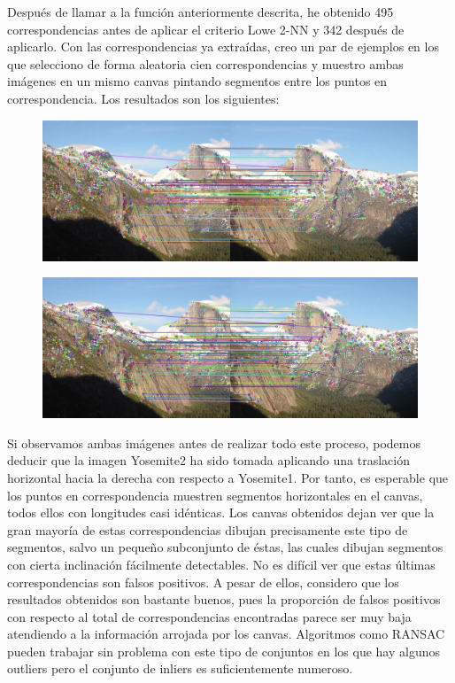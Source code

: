\documentclass[10pt,a4paper]{article}
\begin{document}
Después de llamar a la función anteriormente descrita, he obtenido 495 correspondencias antes de aplicar el criterio Lowe 2-NN y 342 después de aplicarlo. Con las correspondencias ya extraídas, creo un par de ejemplos en los que selecciono de forma aleatoria cien correspondencias y muestro ambas imágenes en un mismo canvas pintando segmentos entre los puntos en correspondencia. Los resultados son los siguientes:

\begin{figure}[h]
	\includegraphics[width=\textwidth]{corresp1_yosemite}
\end{figure}

\begin{figure}[h]
	\includegraphics[width=\textwidth]{corresp2_yosemite}
\end{figure}

\newpage
Si observamos ambas imágenes antes de realizar todo este proceso, podemos deducir que la imagen Yosemite2 ha sido tomada aplicando una traslación horizontal hacia la derecha con respecto a Yosemite1. Por tanto, es esperable que los puntos en correspondencia muestren segmentos horizontales en el canvas, todos ellos con longitudes casi idénticas. Los canvas obtenidos dejan ver que la gran mayoría de estas correspondencias dibujan precisamente este tipo de segmentos, salvo un pequeño subconjunto de éstas, las cuales dibujan segmentos con cierta inclinación fácilmente detectables. No es difícil ver que estas últimas correspondencias son falsos positivos. A pesar de ellos, considero que los resultados obtenidos son bastante buenos, pues la proporción de falsos positivos con respecto al total de correspondencias encontradas parece ser muy baja atendiendo a la información arrojada por los canvas. Algoritmos como RANSAC pueden trabajar sin problema con este tipo de conjuntos en los que hay algunos outliers pero el conjunto de inliers es suficientemente numeroso.
\end{document}
